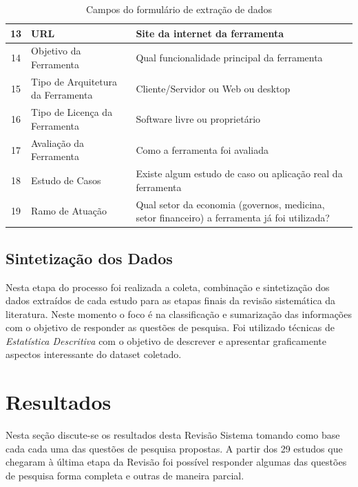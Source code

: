 \documentclass[12pt]{article}
\begin{document}
\begin{table}[ht]
{\begin{tabular}{|c|l|l|}
13          & URL                                    & Site da internet da ferramenta                                                               \\ \hline
14          & Objetivo da Ferramenta                 & Qual funcionalidade principal da ferramenta                                                  \\ \hline
15          & Tipo de Arquitetura da Ferramenta      & Cliente/Servidor ou Web ou desktop                                                           \\ \hline
16          & Tipo de Licença da Ferramenta          & Software livre ou proprietário                                                               \\ \hline
17          & Avaliação da Ferramenta                & Como a ferramenta foi avaliada                                                               \\ \hline
18          & Estudo de Casos                        & Existe algum estudo de caso ou aplicação real da ferramenta                                  \\ \hline
19          & Ramo de Atuação                          & Qual setor da economia (governos, medicina, setor financeiro) a ferramenta já foi utilizada? \\ \hline
\end{tabular}
}
\caption{Campos do formulário de extração de dados}
\label{tab:campos-form}
\end{table}



\subsection{Sintetização dos Dados}
\label{subsec:sintetizacao}
Nesta etapa do processo foi realizada a coleta, combinação e sintetização dos
dados extraídos de cada estudo  para as etapas finais da revisão sistemática da
literatura. Neste momento o foco é na classificação e sumarização das
informações com o objetivo de responder as questões de pesquisa. Foi utilizado
técnicas de \textit{Estatística Descritiva} \cite{wohlin2012experimentation}
com o objetivo de descrever e apresentar graficamente aspectos interessante do dataset coletado.
\section{Resultados}
\label{subsec:resultados}
Nesta seção discute-se os resultados desta Revisão Sistema tomando como base
cada cada uma das questões de pesquisa propostas. A partir dos 29 estudos que
chegaram à última etapa da Revisão foi possível responder algumas das questões
de pesquisa forma completa e outras de maneira parcial.
\end{document}
